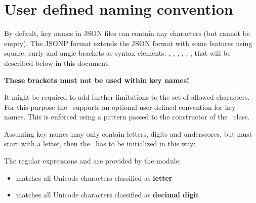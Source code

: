 
\newpage

\section{User defined naming convention}

By default, key names in JSON files can contain any characters (but cannot be empty). The JSONP format extends the JSON format with some features using
square, curly and angle brackets as syntax elements: \pcode{[}, \pcode{]}, \pcode{\{}, \pcode{\}}, \pcode{<}, \pcode{>}, that will be described below in this document.

\textbf{These brackets must not be used within key names!}

It might be required to add further limitations to the set of allowed characters. For this purpose the \pkg\ supports an optional user-defined convention for key names.
This is enforced using a  pattern passed to the constructor of the \pkg\ class.

Assuming key names may only contain letters, digits and underscores, but must start with a letter, then the \pkg\ has to be initialized
in this way:


The regular expressions  and  are provided by the  module:

\begin{itemize}
   \item {} matches all Unicode characters classified as \textbf{letter}
   \item {} matches all Unicode characters classified as \textbf{decimal digit}
\end{itemize}

